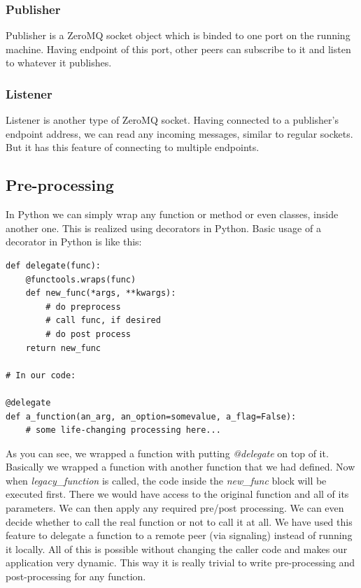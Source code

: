 \subsubsection{Publisher}
Publisher is a ZeroMQ socket object which is binded to one port on the running machine. 
Having endpoint of this port, other peers can subscribe to it and listen to whatever it publishes.

\subsubsection{Listener}
Listener is another type of ZeroMQ socket. 
Having connected to a publisher's endpoint address, 
we can read any incoming messages, similar to regular sockets.
But it has this feature of connecting to multiple endpoints.

\subsection{Pre-processing}
In Python we can simply wrap any function or method or even classes, inside another one.
This is realized using decorators in Python. 
Basic usage of a decorator in Python is like this:

\begin{lstlisting}[caption={Pre-processing with decorators in Python}]
def delegate(func):
    @functools.wraps(func)
    def new_func(*args, **kwargs):
        # do preprocess
        # call func, if desired
        # do post process
    return new_func

# In our code:

@delegate
def a_function(an_arg, an_option=somevalue, a_flag=False):
    # some life-changing processing here...

\end{lstlisting}

As you can see, we wrapped a function with putting \textit{@delegate} on top of it. 
Basically we wrapped a function with another function that we had defined.
Now when \textit{legacy\_function} is called, the code inside the \textit{new\_func} block
will be executed first. 
There we would have access to the original function and all of its parameters. 
We can then apply any required pre/post processing. 
We can even decide whether to call the real function or not to call it at all.
We have used this feature to delegate a function to a remote peer (via signaling) instead of running it locally.
All of this is possible without changing the caller code and makes our application very dynamic.
This way it is really trivial to write pre-processing and post-processing for any function.

